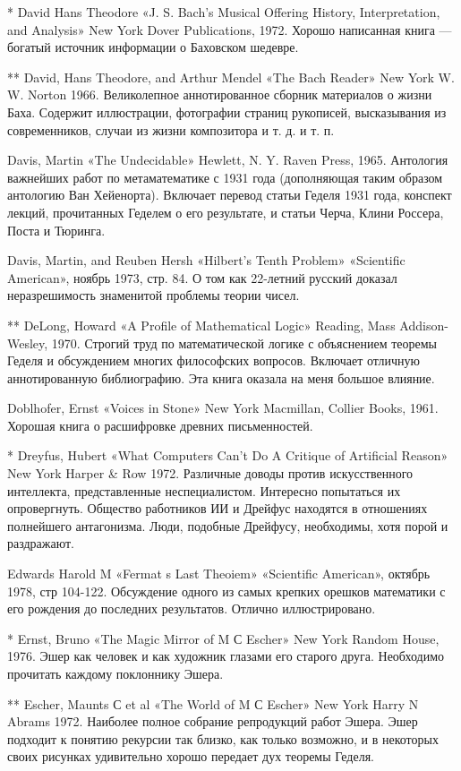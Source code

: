 * David Hans Theodore «J. S. Bach's Musical Offering History, Interpretation, and Analysis» New York Dover Publications, 1972. Хорошо написанная книга --- богатый источник информации о Баховском шедевре.

** David, Hans Theodore, and Arthur Mendel «The Bach Reader» New York W. W. Norton 1966. Великолепное аннотированное сборник материалов о жизни Баха. Содержит иллюстрации, фотографии страниц рукописей, высказывания из современников, случаи из жизни композитора и т. д. и т. п.

Davis, Martin «The Undecidable» Hewlett, N. Y. Raven Press, 1965. Антология важнейших работ по метаматематике с 1931 года (дополняющая таким образом антологию Ван Хейенорта). Включает перевод статьи Геделя 1931 года, конспект лекций, прочитанных Геделем о его результате, и статьи Черча, Клини Россера, Поста и Тюринга.

Davis, Martin, and Reuben Hersh «Hilbert's Tenth Problem» «Scientific American», ноябрь 1973, стр. 84. О том как 22-летний русский доказал неразрешимость знаменитой проблемы теории чисел.

** DeLong, Howard «A Profile of Mathematical Logic» Reading, Mass Addison-Wesley, 1970. Строгий труд по математической логике с объяснением теоремы Геделя и обсуждением многих философских вопросов. Включает отличную аннотированную библиографию. Эта книга оказала на меня большое влияние.

Doblhofer, Ernst «Voices in Stone» New York Macmillan, Collier Books, 1961. Хорошая книга о расшифровке древних письменностей.

* Dreyfus, Hubert «What Computers Can't Do A Critique of Artificial Reason» New York Harper \& Row 1972. Различные доводы против искусственного интеллекта, представленные неспециалистом. Интересно попытаться их опровергнуть. Общество работников ИИ и Дрейфус находятся в отношениях полнейшего антагонизма. Люди, подобные Дрейфусу, необходимы, хотя порой и раздражают.

Edwards Harold M «Fermat s Last Theoiem» «Scientific American», октябрь 1978, стр 104-122. Обсуждение одного из самых крепких орешков математики с его рождения до последних результатов. Отлично иллюстрировано.

* Ernst, Bruno «The Magic Mirror of M С Escher» New York Random House, 1976. Эшер как человек и как художник глазами его старого друга. Необходимо прочитать каждому поклоннику Эшера.

** Escher, Maunts С et al «The World of M С Escher» New York Harry N Abrams 1972. Наиболее полное собрание репродукций работ Эшера. Эшер подходит к понятию рекурсии так близко, как только возможно, и в некоторых своих рисунках удивительно хорошо передает дух теоремы Геделя.

